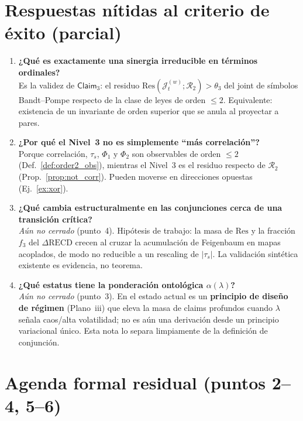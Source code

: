 \documentclass[11pt,a4paper]{article}
\theoremstyle{definition}
\theoremstyle{plain}
\theoremstyle{remark}
\newcommand{\Res}{\mathrm{Res}}
\newcommand{\RECD}{\mathrm{RECD}}
\newcommand{\Rtwo}{\mathcal{R}_2}
\newcommand{\Jwin}{\mathcal{J}}
\newcommand{\claim}{\mathsf{Claim}}
\begin{document}
\section{Respuestas n\'itidas al criterio de \'exito (parcial)}
\label{sec:answers}

\begin{enumerate}[label=\textbf{Q\arabic*.}, leftmargin=*]
  \item \textbf{¿Qu\'e es exactamente una sinergia irreducible en
  t\'erminos ordinales?}\\
  Es la validez de $\claim_3$: el residuo
  $\Res(\Jwin_t^{(w)};\Rtwo)>\theta_3$ del joint de s\'imbolos
  Bandt--Pompe respecto de la clase de leyes de orden $\le 2$.
  Equivalente: existencia de un invariante de orden superior que se
  anula al proyectar a pares.

  \item \textbf{¿Por qu\'e el Nivel~3 no es simplemente ``m\'as
  correlaci\'on''?}\\
  Porque correlaci\'on, $\tau_s$, $\Phi_1$ y $\Phi_2$ son observables de
  orden $\le 2$ (Def.~\ref{def:order2_obs}), mientras el Nivel~3 es el
  residuo respecto de $\Rtwo$ (Prop.~\ref{prop:not_corr}). Pueden moverse
  en direcciones opuestas (Ej.~\ref{ex:xor}).

  \item \textbf{¿Qu\'e cambia estructuralmente en las conjunciones cerca
  de una transici\'on cr\'itica?}\\
  \emph{A\'un no cerrado} (punto~4). Hip\'otesis de trabajo: la masa de
  $\Res$ y la fracci\'on $f_3$ del $\Delta\RECD$ crecen al cruzar la
  acumulaci\'on de Feigenbaum en mapas acoplados, de modo no reducible a
  un rescaling de $|\tau_s|$. La validaci\'on sint\'etica existente es
  evidencia, no teorema.

  \item \textbf{¿Qu\'e estatus tiene la ponderaci\'on ontol\'ogica
  $\alpha(\lambda)$?}\\
  \emph{A\'un no cerrado} (punto~3). En el estado actual es un
  \textbf{principio de dise\~no de r\'egimen} (Plano~iii) que eleva la
  masa de claims profundos cuando $\lambda$ se\~nala caos/alta
  volatilidad; no es a\'un una derivaci\'on desde un principio variacional
  \'unico. Esta nota lo separa limpia\-mente de la definici\'on de
  conjunci\'on.
\end{enumerate}

\section{Agenda formal residual (puntos 2--4, 5--6)}
\label{sec:agenda}
\end{document}
